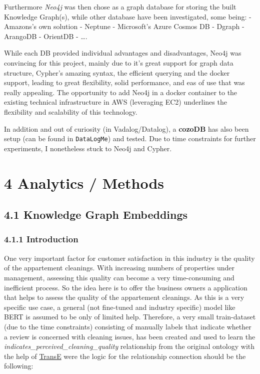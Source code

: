 Furthermore \emph{Neo4j} was then chose as a graph database for storing
the built Knowledge Graph(s), while other database have been
investigated, some being: - Amazons's own solution - Neptune -
Microsoft's Azure Cosmos DB - Dgraph - ArangoDB - OrientDB - \ldots.

While each DB provided individual advantages and disadvantages, Neo4j
was convincing for this project, mainly due to it's great support for
graph data structure, Cypher's amazing syntax, the efficient querying
and the docker support, leading to great flexibility, solid performance,
and eas of use that was really appealing. The opportunity to add Neo4j
in a docker container to the existing technical infrastructure in AWS
(leveraging EC2) underlines the flexibility and scalability of this
technology.

In addition and out of curiosity (in Vadalog/Datalog), a \textbf{cozoDB}
has also been setup (can be found in \texttt{DataLogMe}) and tested. Due
to time constraints for further experiments, I nonetheless stuck to
Neo4j and Cypher.

\section{4 Analytics / Methods}\label{analytics-methods}

\subsection{4.1 Knowledge Graph
Embeddings}\label{knowledge-graph-embeddings}

\subsubsection{4.1.1 Introduction}\label{introduction-1}

One very important factor for customer satisfaction in this industry is
the quality of the appartement cleanings. With increasing numbers of
properties under management, assessing this quality can become a very
time-consuming and inefficient process. So the idea here is to offer the
business owners a application that helps to assess the quality of the
appartement cleanings. As this is a very specific use case, a general
(not fine-tuned and industry specific) model like BERT is assumed to be
only of limited help. Therefore, a very small train-dataset (due to the
time constraints) consisting of manually labels that indicate whether a
review is concerned with cleaning issues, has been created and used to
learn the \emph{indicates\_perceived\_cleaning\_quality} relationship
from the original ontology with the help of
\href{https://proceedings.neurips.cc/paper_files/paper/2013/file/1cecc7a77928ca8133fa24680a88d2f9-Paper.pdf}{TransE}
were the logic for the relationship connection should be the following:

